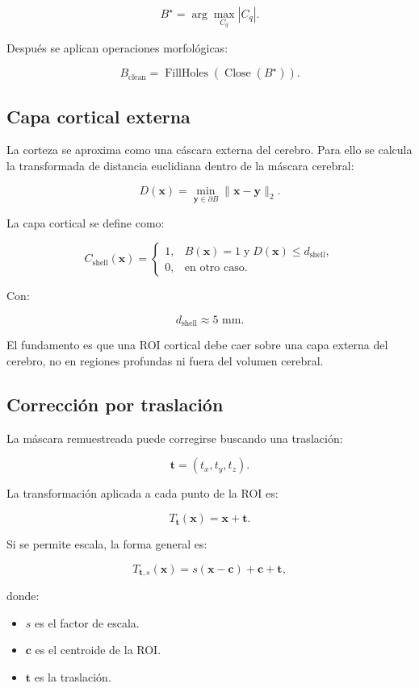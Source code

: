 \documentclass[12pt,a4paper]{article}
\begin{document}
\[
B^\star = \arg\max_{C_q} |C_q|.
\]

Después se aplican operaciones morfológicas:

\[
B_{\text{clean}}
=
\operatorname{FillHoles}
\left(
\operatorname{Close}(B^\star)
\right).
\]

\subsection{Capa cortical externa}

La corteza se aproxima como una cáscara externa del cerebro. Para ello se calcula la transformada de distancia euclidiana dentro de la máscara cerebral:

\[
D(\mathbf{x})
=
\min_{\mathbf{y}\in \partial B}
\|\mathbf{x}-\mathbf{y}\|_2.
\]

La capa cortical se define como:

\[
C_{\text{shell}}(\mathbf{x})
=
\begin{cases}
1, & B(\mathbf{x})=1 \;\text{y}\; D(\mathbf{x})\leq d_{\text{shell}},\\
0, & \text{en otro caso}.
\end{cases}
\]

Con:

\[
d_{\text{shell}}\approx 5\text{ mm}.
\]

El fundamento es que una ROI cortical debe caer sobre una capa externa del cerebro, no en regiones profundas ni fuera del volumen cerebral.

\subsection{Corrección por traslación}

La máscara remuestreada puede corregirse buscando una traslación:

\[
\mathbf{t}=
(t_x,t_y,t_z).
\]

La transformación aplicada a cada punto de la ROI es:

\[
T_{\mathbf{t}}(\mathbf{x})=\mathbf{x}+\mathbf{t}.
\]

Si se permite escala, la forma general es:

\[
T_{\mathbf{t},s}(\mathbf{x})
=
s(\mathbf{x}-\mathbf{c})+\mathbf{c}+\mathbf{t},
\]

donde:

\begin{itemize}
    \item \(s\) es el factor de escala.
    \item \(\mathbf{c}\) es el centroide de la ROI.
    \item \(\mathbf{t}\) es la traslación.
\end{itemize}
\end{document}

